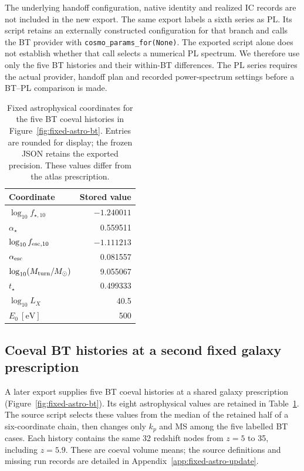 The underlying handoff configuration, native identity and realized IC records are not included in the new export. The same export labels a sixth series as PL. Its script retains an externally constructed configuration for that branch and calls the BT provider with \texttt{cosmo\_params\_for(None)}. The exported script alone does not establish whether that call selects a numerical PL spectrum. We therefore use only the five BT histories and their within-BT differences. The PL series requires the actual provider, handoff plan and recorded power-spectrum settings before a BT--PL comparison is made.

\begin{table}[t]\centering\small
\caption{Fixed astrophysical coordinates for the five BT coeval histories in Figure~\ref{fig:fixed-astro-bt}. Entries are rounded for display; the frozen JSON retains the exported precision. These values differ from the atlas prescription.}\label{tab:fixed-astro-update}
\begin{tabular}{lr}\toprule
Coordinate & Stored value\\\midrule
$\log_{10}f_{\star,10}$ & $-1.240011$\\
$\alpha_\star$ & 0.559511\\
$\log_{10}f_{{\rm esc},10}$ & $-1.111213$\\
$\alpha_{\rm esc}$ & 0.081557\\
$\log_{10}(M_{\rm turn}/M_\odot)$ & 9.055067\\
$t_\star$ & 0.499333\\
$\log_{10}L_X$ & 40.5\\
$E_0\ [\mathrm{eV}]$ & 500\\\bottomrule
\end{tabular}\end{table}

\subsection{Coeval BT histories at a second fixed galaxy prescription}\label{fixed-astro-bt-update}

A later export supplies five BT coeval histories at a shared galaxy prescription (Figure~\ref{fig:fixed-astro-bt}). Its eight astrophysical values are retained in Table~\ref{tab:fixed-astro-update}. The source script selects these values from the median of the retained half of a six-coordinate chain, then changes only $k_p$ and MS among the five labelled BT cases. Each history contains the same 32 redshift nodes from $z=5$ to 35, including $z=5.9$. These are coeval volume means; the source definitions and missing run records are detailed in Appendix~\ref{app:fixed-astro-update}.

